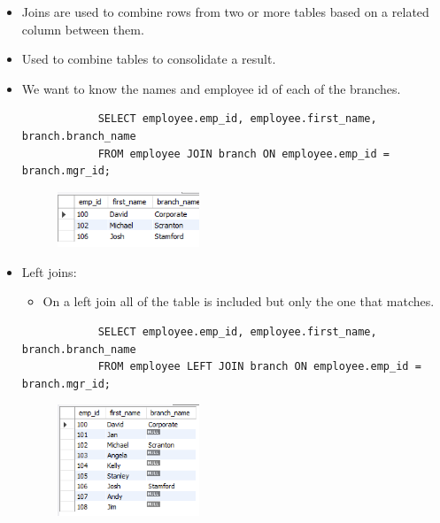 \begin{itemize}
    \item Joins are used to combine rows from two or more tables based on a related column between them.
    \item Used to combine tables to consolidate a result.
    
    \item We want to know the names and employee id of each of the branches.
        \begin{verbatim}
            SELECT employee.emp_id, employee.first_name, branch.branch_name 
            FROM employee JOIN branch ON employee.emp_id = branch.mgr_id;
        \end{verbatim}
        \begin{figure}[H]
            \centering
            \includegraphics[width=0.4\textwidth]{./figs/JOINS.png}
        \end{figure}
    
    \item Left joins:
        \begin{itemize}
            \item On a left join all of the table is included but only the one that matches.
        \end{itemize}
        \begin{verbatim}
            SELECT employee.emp_id, employee.first_name, branch.branch_name 
            FROM employee LEFT JOIN branch ON employee.emp_id = branch.mgr_id;
        \end{verbatim}
        \begin{figure}[H]
            \centering
            \includegraphics[width=0.4\textwidth]{./Figs/2020-12-24-21-05-22.png}
        \end{figure}
    

\end{itemize}
